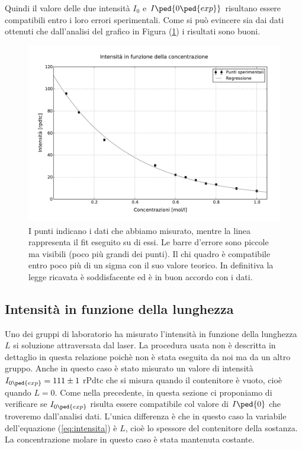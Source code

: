 Quindi il valore delle due intensità $I_0$ e $I\ped{0\ped{exp}}$ risultano essere compatibili entro i loro errori sperimentali. Come si può evincere sia dai dati ottenuti che dall'analisi del grafico in Figura (\ref{fig:g1}) i risultati sono buoni.

\begin{figure}
    \includegraphics[width=135mm]{g1.pdf}
    \caption{I punti indicano i dati che abbiamo misurato, mentre la linea rappresenta il fit eseguito su di essi.
        Le barre d'errore sono piccole ma visibili (poco più grandi dei punti). Il chi quadro è compatibile entro poco più di un sigma
        con il suo valore teorico. In definitiva la legge ricavata è soddisfacente ed è in buon accordo con i dati.}
    \label{fig:g1}
\end{figure}

\subsection{Intensità in funzione della lunghezza}

Uno dei gruppi di laboratorio ha misurato l'intensità in funzione della lunghezza $L$ si soluzione attraversata dal laser.
La procedura usata non è descritta in dettaglio in questa relazione poichè non è stata eseguita da noi ma da un altro gruppo.
Anche in questo caso è stato misurato un valore di intensità $I_{0\ped{exp}} = 111 \pm 1$ rPdtc che si misura quando il contenitore è vuoto,
cioè quando $L = 0$.
Come nella precedente, in questa sezione ci proponiamo di verificare se $I_{0\ped{exp}}$ risulta essere compatibile col valore di $I\ped{0}$ che troveremo dall'analisi dati. L'unica differenza è che in questo caso la variabile dell'equazione (\ref{eq:intensita}) è $L$, cioè lo spessore del contenitore della sostanza. La concentrazione molare in questo caso è stata mantenuta costante.

